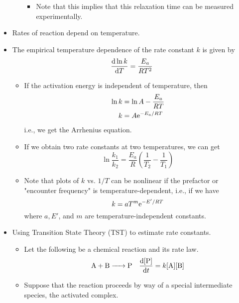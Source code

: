 \documentclass[../notes.tex]{subfiles}
\begin{document}
\begin{itemize}
\begin{itemize}
\begin{itemize}
            \item Note that this implies that this relaxation time can be measured experimentally.
        \end{itemize}
    \end{itemize}
    \item Rates of reaction depend on temperature.
    \item The empirical temperature dependence of the rate constant $k$ is given by
    \begin{equation*}
        \dv{\ln k}{T} = \frac{E_a}{RT^2}
    \end{equation*}
    \begin{itemize}
        \item If the activation energy is independent of temperature, then
        \begin{align*}
            \ln k &= \ln A-\frac{E_a}{RT}\\
            k &= A\e[-E_a/RT]
        \end{align*}
        i.e., we get the Arrhenius equation.
        \item If we obtain two rate constants at two temperatures, we can get
        \begin{equation*}
            \ln\frac{k_1}{k_2} = \frac{E_a}{R}\left( \frac{1}{T_2}-\frac{1}{T_1} \right)
        \end{equation*}
        \item Note that plots of $k$ vs. $1/T$ can be nonlinear if the prefactor or "encounter frequency" is temperature-dependent, i.e., if we have
        \begin{equation*}
            k = aT^m\e[-E'/RT]
        \end{equation*}
        where $a, E'$, and $m$ are temperature-independent constants.
    \end{itemize}
    \item Using Transition State Theory (TST) to estimate rate constants.
    \begin{itemize}
        \item Let the following be a chemical reaction and its rate law.
        \begin{align*}
            \ce{A + B} &\ce{->} \ce{P}&
            \dv{[\ce{P}]}{t} = k[\ce{A}][\ce{B}]
        \end{align*}
        \item Suppose that the reaction proceeds by way of a special intermediate species, the activated complex.
        \begin{equation*}

\end{equation*}
\end{itemize}
\end{itemize}
\end{document}
